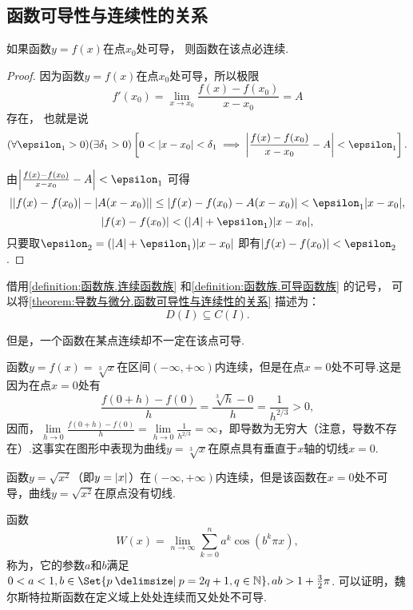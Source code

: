 \subsection{函数可导性与连续性的关系}
\begin{theorem}\label{theorem:导数与微分.函数可导性与连续性的关系}
如果函数\(y = f(x)\)在点\(x_0\)处可导，
则函数在该点必连续.
\begin{proof}
因为函数\(y = f(x)\)在点\(x_0\)处可导，所以极限\[
	f'(x_0) = \lim\limits_{x \to x_0}\frac{f(x)-f(x_0)}{x-x_0} = A
\]存在，
也就是说\[
	(\forall \epsilon_1 > 0)
	(\exists \delta_1 > 0)
	\left[
		0 < \abs{x-x_0} < \delta_1
		\implies
		\abs{\frac{f(x)-f(x_0)}{x-x_0} - A} < \epsilon_1
	\right].
\]

由\(\abs{\frac{f(x)-f(x_0)}{x-x_0} - A} < \epsilon_1\)
可得\[
	\abs{\abs{f(x)-f(x_0)} - \abs{A(x-x_0)}}
	\leq \abs{f(x)-f(x_0) - A(x-x_0)}
	< \epsilon_1 \abs{x-x_0},
\]\[
	\abs{f(x)-f(x_0)} < (\abs{A} + \epsilon_1) \abs{x-x_0},
\]
只要取\(\epsilon_2 = (\abs{A} + \epsilon_1) \abs{x-x_0}\)
即有\(\abs{f(x)-f(x_0)} < \epsilon_2\).
\end{proof}
\end{theorem}
借用\cref{definition:函数族.连续函数族} 和\cref{definition:函数族.可导函数族} 的记号，
可以将\cref{theorem:导数与微分.函数可导性与连续性的关系} 描述为：\[
	D(I) \subseteq C(I).
\]

但是，一个函数在某点连续却不一定在该点可导.
\begin{example}
函数\(y=f(x)=\sqrt[3]x\)在区间\((-\infty,+\infty)\)内连续，但是在点\(x=0\)处不可导.这是因为在点\(x=0\)处有\[
\frac{f(0+h)-f(0)}{h}
=\frac{\sqrt[3]{h}-0}{h}
=\frac{1}{h^{2/3}}>0,
\]因而，\(\lim\limits_{h\to0}\frac{f(0+h)-f(0)}{h}=\lim\limits_{h\to0}\frac{1}{h^{2/3}}=\infty\)，即导数为无穷大（注意，导数不存在）.这事实在图形中表现为曲线\(y=\sqrt[3]x\)在原点具有垂直于\(x\)轴的切线\(x=0\).
\end{example}

\begin{example}
函数\(y=\sqrt{x^2}\)（即\(y=\abs{x}\)）在\((-\infty,+\infty)\)内连续，但是该函数在\(x=0\)处不可导，曲线\(y=\sqrt{x^2}\)在原点没有切线.
\end{example}

\begin{example}
函数\[
W(x) = \lim\limits_{n\to\infty} \sum\limits_{k=0}^n a^k \cos(b^k \pi x),
\]称为，它的参数\(a\)和\(b\)满足\(0<a<1, b\in\Set{ p \given p = 2q+1, q\in\mathbb{N} }, ab > 1+\frac{3}{2}\pi\).
可以证明，魏尔斯特拉斯函数在定义域上处处连续而又处处不可导.
\end{example}

